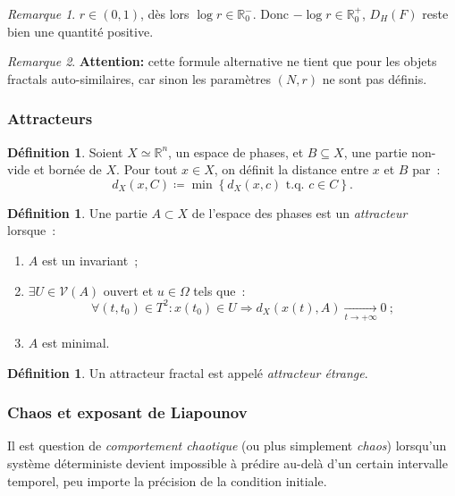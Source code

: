 \documentclass{article}
\theoremstyle{definition}
\newtheorem{déf}[thm]{Définition}
\theoremstyle{remark}
\newtheorem*{rmq}{Remarque}
\newcommand{\R}{\mathbb R}
\newcommand{\tq}{\text{ t.q. }}
\begin{document}
	\begin{rmq} $r \in (0, 1)$, dès lors $\log r \in \R_0^-$. Donc $-\log r \in \R_0^+$, $D_H(F)$ reste bien une quantité positive.
	\end{rmq}

	\begin{rmq} \textbf{Attention: } cette formule alternative ne tient que pour les objets fractals auto-similaires, car sinon les paramètres $(N, r)$ ne
	sont pas définis.
	\end{rmq}

		\subsubsection{Attracteurs}

	\begin{déf} Soient $X \simeq \R^n$, un espace de phases, et $B \subseteq X$, une partie non-vide et bornée de $X$. Pour tout $x \in X$, on définit
	la distance entre $x$ et $B$ par~:
	\[d_X(x, C) \coloneqq \min\left\{d_X(x, c) \tq c \in C\right\}.\]
	\end{déf}

	\begin{déf} Une partie $A \subset X$ de l'espace des phases est un \textit{attracteur} lorsque~:
	\begin{enumerate}
		\item $A$ est un invariant~;
		\item $\exists U \in \mathcal V(A)$ ouvert et $u \in \Omega$ tels que~:
			\[\forall (t, t_0) \in T^2 : x(t_0) \in U \Rightarrow d_X(x(t), A) \xrightarrow[t \to +\infty]{} 0~;\]
		\item $A$ est minimal.
	\end{enumerate}
	\end{déf}

	\begin{déf} Un attracteur fractal est appelé \textit{attracteur étrange}.
	\end{déf}

		\subsubsection{Chaos et exposant de Liapounov}

	Il est question de \textit{comportement chaotique} (ou plus simplement \textit{chaos}) lorsqu'un système déterministe devient impossible à prédire au-delà
	d'un certain intervalle temporel, peu importe la précision de la condition initiale.
\end{document}
